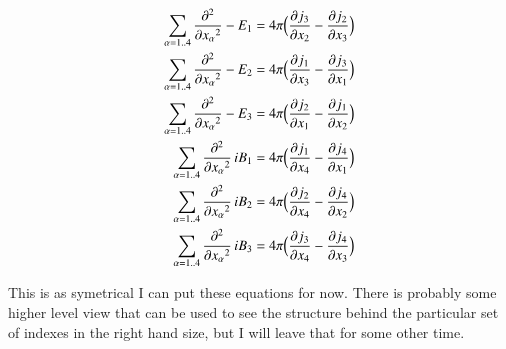 \documentclass{article}      %
\newcommand{\delambert}[1]{\sum_{\alpha = 1 .. 4}{\Dsq{x_\alpha}{#1}}}
\newcommand{\D}[2] {\frac {\partial #2} {\partial #1}}
\newcommand{\Dsq}[2] {\frac {\partial^2 #2} {\partial {#1}^2}}
\begin{document}
\begin{align*}
\delambert{} -E_1 &= 4\pi \Bigl(\D{x_2}{j_3} - \D{x_3}{j_2} \Bigr) \\
\delambert{} -E_2 &= 4\pi \Bigl(\D{x_3}{j_1} - \D{x_1}{j_3} \Bigr) \\
\delambert{} -E_3 &= 4\pi \Bigl(\D{x_1}{j_2} - \D{x_2}{j_1} \Bigr) \\
\delambert{} \,i B_1 &= 4\pi \Bigl(\D{x_4}{j_1} - \D{x_1}{j_4} \Bigr)\\
\delambert{} \,i B_2 &= 4\pi \Bigl(\D{x_4}{j_2} - \D{x_2}{j_4} \Bigr)\\
\delambert{} \,i B_3 &= 4\pi \Bigl(\D{x_4}{j_3} - \D{x_3}{j_4} \Bigr)
\end{align*}

This is as symetrical I can put these equations for now.  There is probably some higher level 
view that can be used to see the structure behind the particular set of indexes in the right 
hand size, but I will leave that for some other time.
\end{document}
